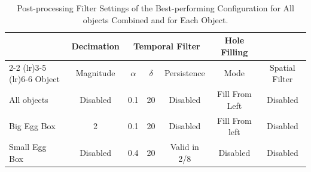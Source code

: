 \begin{table}[htbp]
	\centering
	\caption{Post-processing Filter Settings of the Best-performing Configuration
		for All objects Combined and for Each Object.}
	\label{tab:filter_settings}
	\begin{tabular}{l c c c c c c}
		\toprule
		& \multicolumn{1}{c}{Decimation}
		& \multicolumn{3}{c}{Temporal Filter}
		& \multicolumn{1}{c}{Hole Filling} \\
		\cmidrule(lr){2-2} \cmidrule(lr){3-5} \cmidrule(lr){6-6}
		Object & Magnitude & $\alpha$ & $\delta$ & Persistence & Mode & Spatial Filter\\
		\midrule
		All objects & Disabled & 0.1 & 20 & Disabled  & Fill From Left & Disabled\\
		Big Egg Box    & 2   & 0.1 & 20 & Disabled  & Fill From left & Disabled\\
		Small Egg Box  & Disabled & 0.4 & 20 & Valid in 2/8        & Disabled & Disabled \\
		\bottomrule
	\end{tabular}
\end{table}

